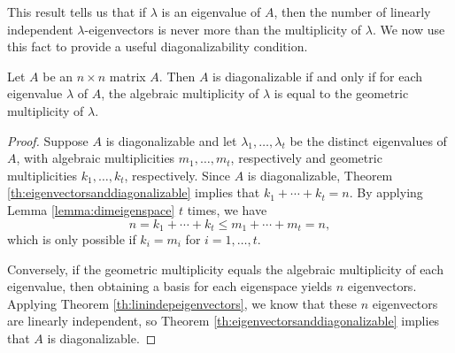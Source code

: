\documentclass{ximera}
\begin{document}
This result tells us that if $\lambda$ is an eigenvalue of $A$, then
the number of linearly independent $\lambda$-eigenvectors
is never more than the multiplicity of $\lambda$. We now use this fact to provide a useful diagonalizability condition.

\begin{theorem}\label{th:diagonalizability}
Let $A$ be an $n \times n$ matrix $A$. Then $A$ is diagonalizable if and only if for each eigenvalue $\lambda$ of $A$, the algebraic multiplicity of $\lambda$ is equal to the geometric multiplicity of $\lambda$.
\end{theorem}

\begin{proof}
Suppose $A$ is diagonalizable and let $\lambda_1, \ldots, \lambda_t$ be the distinct eigenvalues of $A$, with algebraic multiplicities $m_1, \ldots, m_t$, respectively and geometric multiplicities $k_1, \ldots, k_t$, respectively.  Since $A$ is diagonalizable, Theorem \ref{th:eigenvectorsanddiagonalizable} implies that $ k_1+\cdots+k_t=n$.  By applying Lemma \ref{lemma:dimeigenspace} $t$ times, we have
$$n = k_1+\cdots+k_t \le m_1+\cdots+m_t = n,$$
which is only possible if $k_i=m_i$ for $i=1,\ldots,t$.

Conversely, if the geometric multiplicity equals the algebraic multiplicity of each eigenvalue, then obtaining a basis for each eigenspace yields $n$ eigenvectors.  Applying Theorem \ref{th:linindepeigenvectors}, we know that these $n$ eigenvectors are linearly independent, so Theorem \ref{th:eigenvectorsanddiagonalizable} implies that $A$ is diagonalizable.
\end{proof}
\end{document}
